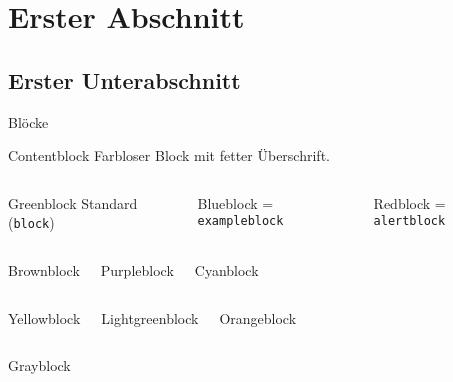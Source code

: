 \section{Erster Abschnitt}

\subsection{Erster Unterabschnitt}
\begin{frame}{Blöcke}
    \begin{contentblock}{Contentblock}
        Farbloser Block mit fetter Überschrift.
    \end{contentblock}
    \begin{columns}
        \begin{greenblock}{Greenblock}
            Standard (\texttt{block})
        \end{greenblock}
                \begin{blueblock}{Blueblock}
                    = \texttt{exampleblock}
                \end{blueblock}
                \begin{redblock}{Redblock}
                    = \texttt{alertblock}
                \end{redblock}
        \end{columns}
        \begin{columns}
            \begin{brownblock}{Brownblock}
            \end{brownblock}
            \begin{purpleblock}{Purpleblock}
            \end{purpleblock}
            \begin{cyanblock}{Cyanblock}
            \end{cyanblock}
        \end{columns}
        \begin{columns}
            \begin{yellowblock}{Yellowblock}
            \end{yellowblock}
            \begin{lightgreenblock}{Lightgreenblock}
            \end{lightgreenblock}
            \begin{orangeblock}{Orangeblock}
            \end{orangeblock}
        \end{columns}
        \begin{columns}
            \begin{grayblock}{Grayblock}
            \end{grayblock}
        \end{columns}
\end{frame}

